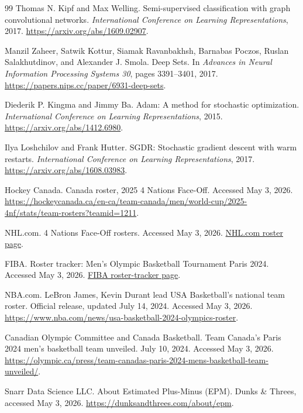 \documentclass[11pt,letterpaper]{article}
\begin{document}
\begin{thebibliography}{99}
Thomas N. Kipf and Max Welling.
Semi-supervised classification with graph convolutional networks.
\emph{International Conference on Learning Representations}, 2017.
\url{https://arxiv.org/abs/1609.02907}.

Manzil Zaheer, Satwik Kottur, Siamak Ravanbakhsh, Barnabas Poczos,
Ruslan Salakhutdinov, and Alexander J. Smola.
Deep Sets.
In \emph{Advances in Neural Information Processing Systems 30},
pages 3391--3401, 2017.
\url{https://papers.nips.cc/paper/6931-deep-sets}.

Diederik P. Kingma and Jimmy Ba.
Adam: A method for stochastic optimization.
\emph{International Conference on Learning Representations}, 2015.
\url{https://arxiv.org/abs/1412.6980}.

Ilya Loshchilov and Frank Hutter.
SGDR: Stochastic gradient descent with warm restarts.
\emph{International Conference on Learning Representations}, 2017.
\url{https://arxiv.org/abs/1608.03983}.

Hockey Canada.
Canada roster, 2025 4 Nations Face-Off.
Accessed May 3, 2026.
\url{https://hockeycanada.ca/en-ca/team-canada/men/world-cup/2025-4nf/stats/team-rosters?teamid=1211}.

NHL.com.
4 Nations Face-Off rosters.
Accessed May 3, 2026.
\href{https://www.nhl.com/news/topic/4-nations-face-off/4-nations-face-off-rosters-canada-united-states-sweden-finland}{NHL.com roster page}.

FIBA.
Roster tracker: Men's Olympic Basketball Tournament Paris 2024.
Accessed May 3, 2026.
\href{https://www.fiba.basketball/en/news/olympics-men-2024-news-roster-tracker-men-s-olympic-basketball-tournament-paris-2024}{FIBA roster-tracker page}.

NBA.com.
LeBron James, Kevin Durant lead USA Basketball's national team roster.
Official release, updated July 14, 2024. Accessed May 3, 2026.
\url{https://www.nba.com/news/usa-basketball-2024-olympics-roster}.

Canadian Olympic Committee and Canada Basketball.
Team Canada's Paris 2024 men's basketball team unveiled.
July 10, 2024. Accessed May 3, 2026.
\url{https://olympic.ca/press/team-canadas-paris-2024-mens-basketball-team-unveiled/}.

Snarr Data Science LLC.
About Estimated Plus-Minus (EPM).
Dunks \& Threes, accessed May 3, 2026.
\url{https://dunksandthrees.com/about/epm}.

\end{thebibliography}
\end{document}
